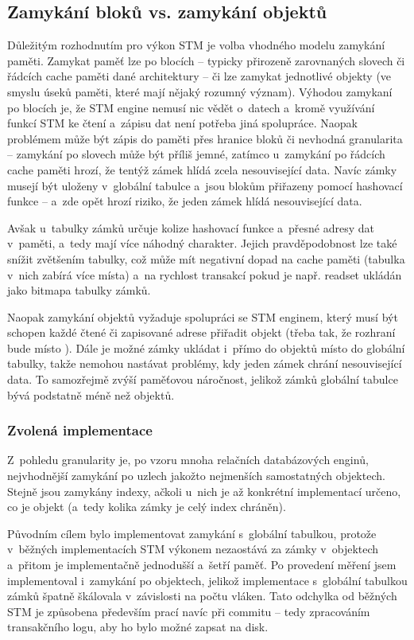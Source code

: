 \subsection{Zamykání bloků vs. zamykání objektů}

Důležitým rozhodnutím pro výkon STM je volba vhodného modelu zamykání paměti.
Zamykat paměť lze po blocích -- typicky přirozeně zarovnaných slovech či
řádcích cache paměti
dané architektury -- či lze zamykat jednotlivé objekty (ve smyslu úseků paměti,
které mají nějaký rozumný význam). Výhodou zamykaní po blocích je, že STM engine
nemusí nic vědět o~datech a~kromě využívání funkcí STM ke čtení a~zápisu
dat není potřeba jiná spolupráce. Naopak problémem může být zápis do paměti
přes hranice bloků či nevhodná granularita -- zamykání po slovech může být příliš
jemné, zatímco u~zamykání po řádcích cache paměti hrozí, že tentýž zámek hlídá zcela
nesouvisející data. Navíc zámky musejí být uloženy v~globální tabulce
a~jsou blokům přiřazeny pomocí hashovací funkce -- a~zde opět hrozí
riziko, že jeden zámek hlídá nesouvisející data.

Avšak u~tabulky zámků určuje kolize hashovací
funkce a~přesné adresy dat v~paměti, a~tedy mají více náhodný charakter.
Jejich pravděpodobnost lze také snížit zvětšením tabulky, což může mít
negativní dopad na cache paměti (tabulka v~nich zabírá více místa) a~na rychlost
transakcí pokud je např. readset ukládán jako bitmapa tabulky zámků.

Naopak zamykání objektů vyžaduje spolupráci se STM enginem, který musí být
schopen každé čtené či zapisované adrese přiřadit objekt (třeba tak, že rozhraní bude
 místo ). Dále je možné zámky ukládat i~přímo
do objektů místo do globální tabulky, takže nemohou nastávat problémy, kdy jeden
zámek chrání nesouvisející data. To samozřejmě zvýší paměťovou náročnost, jelikož
zámků globální tabulce bývá podstatně méně než objektů.

\subsubsection*{Zvolená implementace}
Z~pohledu granularity je, po vzoru mnoha relačních databázových enginů,
nejvhodnější zamykání po uzlech jakožto nejmenších samostatných objektech.
Stejně jsou zamykány indexy, ačkoli u~nich je až konkrétní implementací určeno,
co je objekt (a~tedy kolika zámky je celý index chráněn).

Původním cílem bylo implementovat zamykání s~globální tabulkou, protože v~běžných
implementacích STM výkonem nezaostává za zámky v~objektech a~přitom je implementačně
jednodušší a~šetří paměť. Po provedení měření jsem implementoval i~zamykání po objektech,
jelikož implementace s~globální tabulkou zámků špatně škálovala v~závislosti na počtu
vláken. Tato odchylka od běžných STM je způsobena především prací navíc
při commitu -- tedy zpracováním transakčního logu, aby ho bylo možné zapsat
na disk.

